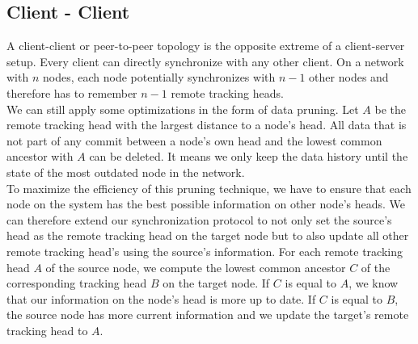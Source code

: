 \subsection{Client - Client}
\label{sec:histo.topologies.p2p}
A client-client or peer-to-peer topology is the opposite extreme of a client-server setup.
Every client can directly synchronize with any other client.
On a network with $ n $ nodes, each node potentially synchronizes with $ n - 1 $ other nodes and therefore has to remember $ n - 1 $ remote tracking heads.\\
We can still apply some optimizations in the form of data pruning.
Let $ A $ be the remote tracking head with the largest distance to a node's head.
All data that is not part of any commit between a node's own head and the lowest common ancestor with $ A $ can be deleted.
It means we only keep the data history until the state of the most outdated node in the network.\\
To maximize the efficiency of this pruning technique, we have to ensure that each node on the system has the best possible information on other node's heads.
We can therefore extend our synchronization protocol to not only set the source's head as the remote tracking head on the target node but to also update all other remote tracking head's using the source's information.
For each remote tracking head $ A $ of the source node, we compute the lowest common ancestor $ C $ of the corresponding tracking head $ B $ on the target node.
If $ C $ is equal to $ A $, we know that our information on the node's head is more up to date.
If $ C $ is equal to $ B $, the source node has more current information and we update the target's remote tracking head to $ A $.

